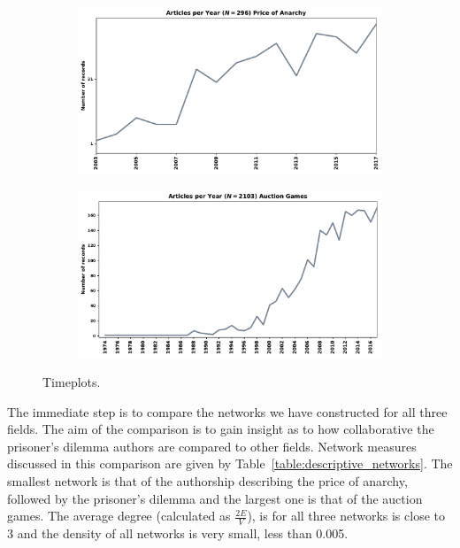\documentclass{article}
\begin{document}
\begin{center}
\begin{figure}[!hbtp]
    \begin{subfigure}{0.5\textwidth}
        \includegraphics[width=\textwidth]{./assets/images/anarchy_timeline.pdf}
    \end{subfigure}
    \begin{subfigure}{0.5\textwidth}
        \includegraphics[width=\textwidth]{./assets/images/auction_timeline.pdf}
    \end{subfigure}
\caption{Timeplots.}\label{fig:timeplots_anarchy_auction}
\end{figure}
\end{center}


The immediate step is to compare the networks we have constructed for all three 
fields. The aim of the comparison is to gain insight as to how collaborative
the prisoner's dilemma authors are compared to other fields. Network measures
discussed in this comparison are given by Table~\ref{table:descriptive_networks}.
The smallest network is that of the authorship describing the price of anarchy,
followed by the prisoner's dilemma and the largest one is that of the auction
games. The average degree (calculated as \(\frac{2E}{V}\)), is for all three
networks is close to 3 and the density of all networks is very small, less than
0.005.
\end{document}
